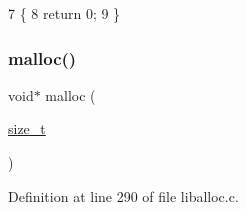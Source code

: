 \begin{DoxyCode}
7                       \{
8     \textcolor{keywordflow}{return} 0;
9 \}
\end{DoxyCode}
\mbox{\label{a00026_a1c8580582aae58105f16108d4ec89e9a_a1c8580582aae58105f16108d4ec89e9a}} 
\subsubsection{\texorpdfstring{malloc()}{malloc()}}
{\footnotesize\ttfamily void$\ast$ malloc (\begin{DoxyParamCaption}\item[{\hyperlink{a00026_a7c94ea6f8948649f8d181ae55911eeaf_a7c94ea6f8948649f8d181ae55911eeaf}{size\+\_\+t}}]{ }\end{DoxyParamCaption})}



Definition at line 290 of file liballoc.\+c.


